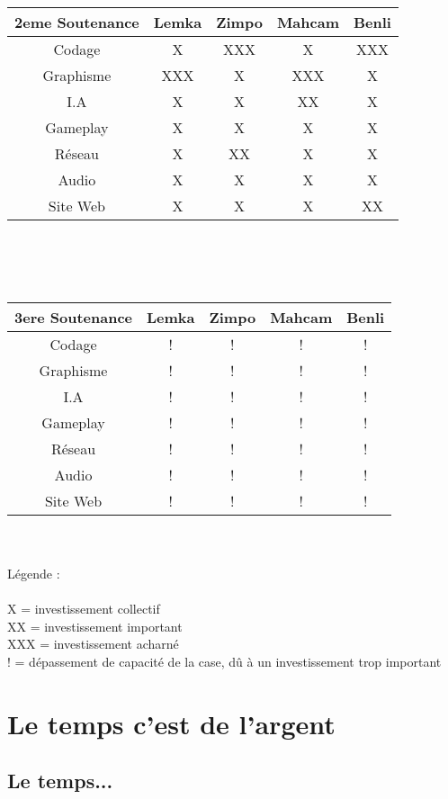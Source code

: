 \documentclass[12pt]{article}
\begin{document}
\begin{tabular}{|c|c|c|c|c|}
\hline
2eme Soutenance & Lemka & Zimpo & Mahcam & Benli\\ \hline
Codage & X  & XXX & X & XXX \\ \hline
Graphisme & XXX & X & XXX & X \\ \hline
I.A & X & X & XX & X \\ \hline
Gameplay & X & X & X & X \\ \hline
Réseau & X & XX & X & X\\ \hline
Audio & X & X & X & X \\ \hline
Site Web & X & X & X & XX \\ \hline
\end{tabular}\\\\\\

\begin{tabular}{|c|c|c|c|c|}
\hline
3ere Soutenance & Lemka & Zimpo & Mahcam & Benli\\ \hline
Codage & ! & ! & ! & ! \\ \hline
Graphisme & ! & ! & ! & ! \\ \hline
I.A & ! & ! & ! & ! \\ \hline
Gameplay & ! & ! & ! & ! \\ \hline
Réseau & ! & ! & ! & ! \\ \hline
Audio & ! & ! & ! & ! \\ \hline
Site Web & ! & ! & ! & ! \\ \hline
\end{tabular}\\\\

Légende :\\\\
X = investissement collectif\\
XX = investissement important\\
XXX = investissement acharné\\
! = dépassement de capacité de la case, dû à un investissement trop important
     

\newpage
\section{Le temps c'est de l'argent}

\subsection{Le temps...}
\end{document}
